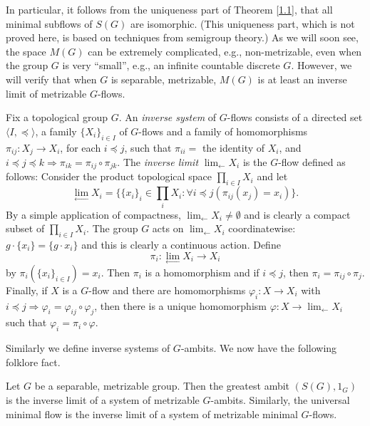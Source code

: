 In particular, it follows from the uniqueness part of Theorem \ref{1.1}, that all
minimal subflows of $S(G)$ are isomorphic.  (This uniqueness part, which
is not proved here, is based on techniques from semigroup theory.)
As we will soon see, the space $M(G)$ can be extremely complicated, e.g.,
non-metrizable, even when the group $G$ is very ``small'', e.g.,
an infinite
countable discrete $G$.  However, we will verify that when $G$ is
separable, metrizable, $M(G)$ is at least an inverse limit of metrizable
$G$-flows.

Fix a topological group $G$.  An {\it inverse system} of $G$-flows consists
of a directed set $\langle I,\preceq\rangle$, a family $\{X_i\}_{i\in I}$
of $G$-flows and a family of homomorphisms $\pi_{ij}:X_j\rightarrow X_i$,
for each $i\preceq j$, such that $\pi_{ii}=$ the identity of $X_i$, and
$i\preceq j\preceq k\Rightarrow\pi_{ik}=\pi_{ij}\circ\pi_{jk}$.  The
    {\it inverse limit} $\lim_{\leftarrow}X_i$ is the $G$-flow defined as
follows:  Consider the product topological space $\prod_{i\in I}X_i$ and
let
\[
    \lim_{\leftarrow}X_i=\{\{x_i\}_i\in\prod_iX_i:\forall i\preceq j(\pi_{ij}
    (x_j)=x_i)\}.
\]
By a simple application of compactness, $\lim_{\leftarrow}X_i\neq\emptyset$ and is
clearly a compact subset of $\prod_{i\in I}X_i$.  The group $G$ acts on
$\lim_{\leftarrow}X_i$ coordinatewise:  $g\cdot\{x_i\}=\{g\cdot x_i\}$ and
this is clearly a continuous action.  Define
\[
    \pi_i:\lim_{\leftarrow}X_i\rightarrow X_i
\]
by $\pi_i(\{x_i\}_{i\in I})=x_i$.  Then $\pi_i$ is a homomorphism and
if $i\preceq j$, then $\pi_i=\pi_{ij}\circ\pi_j$.  Finally, if $X$ is a
$G$-flow and there are homomorphisms $\varphi_i:X\rightarrow X_i$ with
$i\preceq j\Rightarrow\varphi_i=\varphi_{ij}\circ\varphi_j$, then there is
a unique homomorphism $\varphi :X\rightarrow\lim_{\leftarrow}X_i$ such
that $\varphi_i=\pi_i\circ\varphi$.

Similarly we define inverse systems of $G$-ambits.  We now have the following
folklore fact.

\begin{theorem}
    \label{1.5}
    Let $G$ be a separable, metrizable group.
    Then the greatest ambit $(S(G),1_G)$ is the inverse limit of a system of
    metrizable $G$-ambits.  Similarly, the universal minimal flow is the inverse
    limit of a system of metrizable minimal $G$-flows.
\end{theorem}

